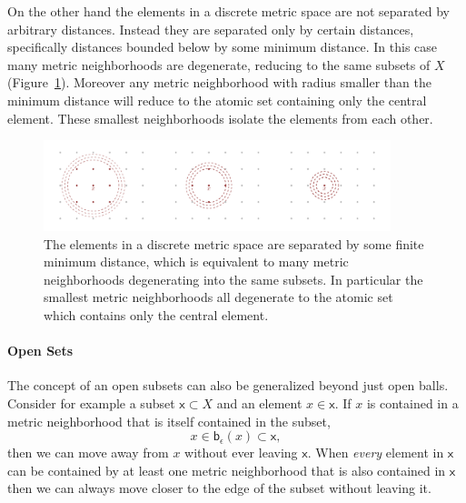 \documentclass[
  letterpaper,
  DIV=11,
  numbers=noendperiod]{scrartcl}
\let\oldparagraph\paragraph
\renewcommand{\paragraph}[1]{\oldparagraph{#1}\mbox{}}
\begin{document}
On the other hand the elements in a discrete metric space are not
separated by arbitrary distances. Instead they are separated only by
certain distances, specifically distances bounded below by some minimum
distance. In this case many metric neighborhoods are degenerate,
reducing to the same subsets of \(X\)
(Figure~\ref{fig-metric-discrete-neighborhoods}). Moreover any metric
neighborhood with radius smaller than the minimum distance will reduce
to the atomic set containing only the central element. These smallest
neighborhoods isolate the elements from each other.

\begin{figure}

{\centering \includegraphics[width=0.9\textwidth,height=\textheight]{figures/structures/metric_topology/discrete_neighborhoods/discrete_neighborhoods.pdf}

}

\caption{\label{fig-metric-discrete-neighborhoods}The elements in a
discrete metric space are separated by some finite minimum distance,
which is equivalent to many metric neighborhoods degenerating into the
same subsets. In particular the smallest metric neighborhoods all
degenerate to the atomic set which contains only the central element.}

\end{figure}

\hypertarget{sec:open-sets}{%
\paragraph{Open Sets}\label{sec:open-sets}}

The concept of an open subsets can also be generalized beyond just open
balls. Consider for example a subset \(\mathsf{x} \subset X\) and an
element \(x \in \mathsf{x}\). If \(x\) is contained in a metric
neighborhood that is itself contained in the subset, \[
x \in \mathsf{b}_{\epsilon}(x) \subset \mathsf{x},
\] then we can move away from \(x\) without ever leaving \(\mathsf{x}\).
When \emph{every} element in \(\mathsf{x}\) can be contained by at least
one metric neighborhood that is also contained in \(\mathsf{x}\) then we
can always move closer to the edge of the subset without leaving it.
\end{document}
